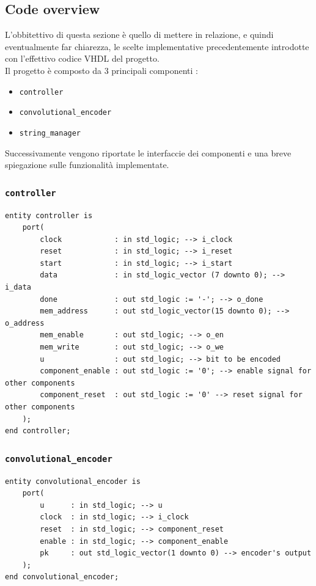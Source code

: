 \documentclass[11pt,a4paper]{article}
\begin{document}
        \subsection{Code overview}
            L'obbitettivo di questa sezione è quello di mettere in relazione, e quindi eventualmente far chiarezza, le scelte implementative precedentemente introdotte con l'effettivo codice VHDL del progetto.\\
            Il progetto è composto da 3 principali componenti :
            \begin{itemize}
                \item \texttt{controller}
                \item \texttt{convolutional\_encoder}
                \item \texttt{string\_manager}
            \end{itemize}
            Successivamente vengono riportate le interfaccie dei componenti e una breve spiegazione sulle funzionalità implementate.
            \subsubsection{\texttt{controller}}
                \begin{verbatim}
entity controller is
    port(
        clock            : in std_logic; --> i_clock
        reset            : in std_logic; --> i_reset
        start            : in std_logic; --> i_start
        data             : in std_logic_vector (7 downto 0); --> i_data
        done             : out std_logic := '-'; --> o_done
        mem_address      : out std_logic_vector(15 downto 0); --> o_address
        mem_enable       : out std_logic; --> o_en
        mem_write        : out std_logic; --> o_we
        u                : out std_logic; --> bit to be encoded
        component_enable : out std_logic := '0'; --> enable signal for other components
        component_reset  : out std_logic := '0' --> reset signal for other components
    );
end controller;
                \end{verbatim}
            \subsubsection{\texttt{convolutional\_encoder}}
                \begin{verbatim}
entity convolutional_encoder is 
    port(
        u      : in std_logic; --> u
        clock  : in std_logic; --> i_clock
        reset  : in std_logic; --> component_reset
        enable : in std_logic; --> component_enable
        pk     : out std_logic_vector(1 downto 0) --> encoder's output
    );
end convolutional_encoder;
                \end{verbatim}
\end{document}

